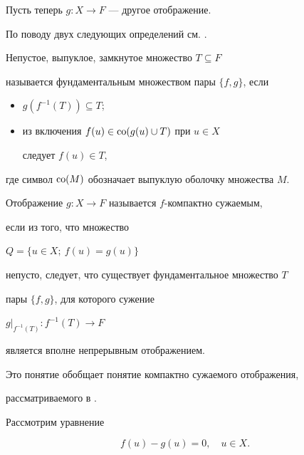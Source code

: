 Пусть теперь $g:X \to F$ --- другое отображение.


По поводу двух следующих определений см. \cite{5}.





\begin{defns}


Непустое, выпуклое, замкнутое множество $T \subseteq F$


называется фундаментальным множеством пары $\{f, g \}$, если


\begin{itemize}


\item[1)] $g(f^{-1}(T)) \subseteq T$;


\item[2)] из включения $f(u) \in \operatorname{co} (g(u) \cup T)$ при $u \in X$


следует $f(u) \in T$,


\end{itemize}


где символ $\operatorname{co} (M) $ обозначает выпуклую оболочку множества $M$.


\end{defns}





\begin{defns}


Отображение $g:X \to F$ называется $f$-компактно сужаемым, 


если из того, что множество 


$Q = \{u\in X;\ f(u) = g(u) \}$


непусто, следует, что существует фундаментальное множество $T$


пары $\{f, g \}$, для которого сужение 


$g|_{f^{-1}(T)}: f^{-1}(T) \to F$


является вполне непрерывным отображением.


\end{defns}





Это понятие обобщает понятие компактно сужаемого отображения,


рассматриваемого в \cite{88}.





Рассмотрим уравнение


\begin{equation}


f(u) - g(u) = 0, \quad u \in X.


\end{equation}


